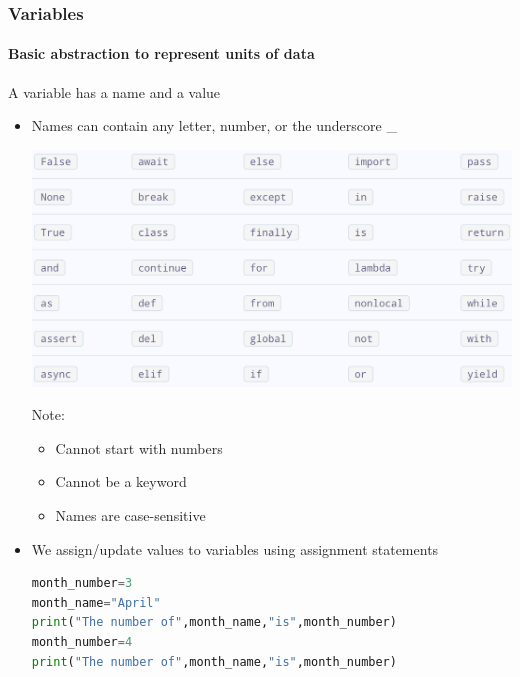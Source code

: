 \documentclass{beamer}%
\begin{document}
\begin{frame}[fragile]
	\frametitle{{Variables}}
	\framesubtitle{Basic abstraction to represent units of data}
	A variable has a name and a value
	\begin{itemize}
		\item Names can contain any letter, number, or the underscore \_
		\\
		\begin{minipage}{0.50\textwidth}
			\includegraphics[width=1.0\textwidth]{figures/keywords}
		\end{minipage}
		\begin{minipage}{0.42\textwidth}
			Note:
			\begin{itemize}
				\item Cannot start with numbers
				\item Cannot be a  keyword
				\item Names are case-sensitive
			\end{itemize}
		\end{minipage}
		
		\item We assign/update values to variables using assignment statements
		
\begin{lstlisting}[language=python]
month_number=3
month_name="April"
print("The number of",month_name,"is",month_number)
month_number=4
print("The number of",month_name,"is",month_number)
\end{lstlisting}
\end{itemize}
\end{frame}
\end{document}
